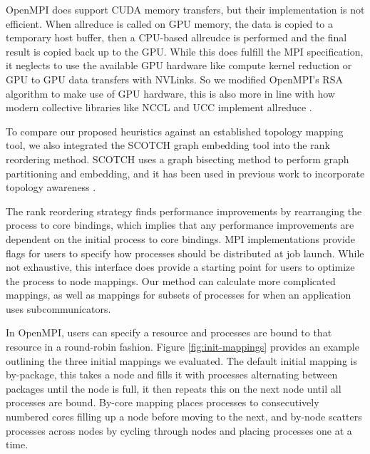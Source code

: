 OpenMPI does support CUDA memory transfers, but their implementation is not efficient. 
When allreduce is called on GPU memory, the data is copied to a temporary host buffer, then a CPU-based allreudce is performed and the final result is copied back up to the GPU.
While this does fulfill the MPI specification, it neglects to use the available GPU hardware like compute kernel reduction or GPU to GPU data transfers with NVLinks.
So we modified OpenMPI's RSA algorithm to make use of GPU hardware, this is also more in line with how modern collective libraries like NCCL and UCC implement allreduce \cite{UCC, NCCL}.

To compare our proposed heuristics against an established topology mapping tool, we also integrated the SCOTCH graph embedding tool \cite{Pellegrini2012SCOTCH} into the rank reordering method.
SCOTCH uses a graph bisecting method to perform graph partitioning and embedding, and it has been used in previous work to incorporate topology awareness \cite{Mirsadeghi2016TopoAwareCollRR}.

The rank reordering strategy finds performance improvements by rearranging the process to core bindings, which implies that any performance improvements are dependent on the initial process to core bindings.
MPI implementations provide flags for users to specify how processes should be distributed at job launch. 
While not exhaustive, this interface does provide a starting point for users to optimize the process to node mappings.
Our method can calculate more complicated mappings, as well as mappings for subsets of processes for when an application uses subcommunicators.  

In OpenMPI, users can specify a resource and processes are bound to that resource in a round-robin fashion.
Figure \ref{fig:init-mappings} provides an example outlining the three initial mappings we evaluated.
The default initial mapping is by-package, this takes a node and fills it with processes alternating between packages until the node is full, it then repeats this on the next node until all processes are bound.
By-core mapping places processes to consecutively numbered cores filling up a node before moving to the next, and by-node scatters processes across nodes by cycling through nodes and placing processes one at a time.



